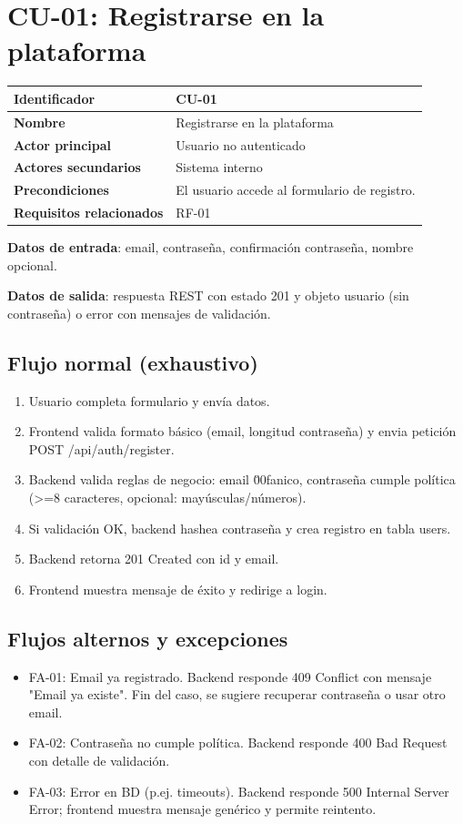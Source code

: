 \documentclass[12pt,a4paper]{article}
\begin{document}
\section{CU-01: Registrarse en la plataforma}
\begin{tabular}{|p{3.5cm}|p{10cm}|}
\hline
\textbf{Identificador} & CU-01 \\
\hline
\textbf{Nombre} & Registrarse en la plataforma \\
\hline
\textbf{Actor principal} & Usuario no autenticado \\
\hline
\textbf{Actores secundarios} & Sistema interno \\
\hline
\textbf{Precondiciones} & El usuario accede al formulario de registro. \\
\hline
\textbf{Requisitos relacionados} & RF-01 \\
\hline
\end{tabular}

\vspace{0.5em}
\textbf{Datos de entrada}: email, contrase\~na, confirmaci\'on contrase\~na, nombre opcional.

\textbf{Datos de salida}: respuesta REST con estado 201 y objeto usuario (sin contrase\~na) o error con mensajes de validaci\'on.

\subsection*{Flujo normal (exhaustivo)}
\begin{enumerate}[leftmargin=*]
    \item Usuario completa formulario y env\'ia datos.
    \item Frontend valida formato b\'asico (email, longitud contrase\~na) y envia petici\'on POST /api/auth/register.
    \item Backend valida reglas de negocio: email \u00fanico, contrase\~na cumple pol\'itica (>=8 caracteres, opcional: may\'usculas/n\'umeros).
    \item Si validaci\'on OK, backend hashea contrase\~na y crea registro en tabla users.
    \item Backend retorna 201 Created con id y email.
    \item Frontend muestra mensaje de \'exito y redirige a login.
\end{enumerate}

\subsection*{Flujos alternos y excepciones}
\begin{itemize}[leftmargin=*]
    \item FA-01: Email ya registrado. Backend responde 409 Conflict con mensaje "Email ya existe". Fin del caso, se sugiere recuperar contrase\~na o usar otro email.
    \item FA-02: Contrase\~na no cumple pol\'itica. Backend responde 400 Bad Request con detalle de validaci\'on.
    \item FA-03: Error en BD (p.ej. timeouts). Backend responde 500 Internal Server Error; frontend muestra mensaje gen\'erico y permite reintento.
\end{itemize}
\end{document}
